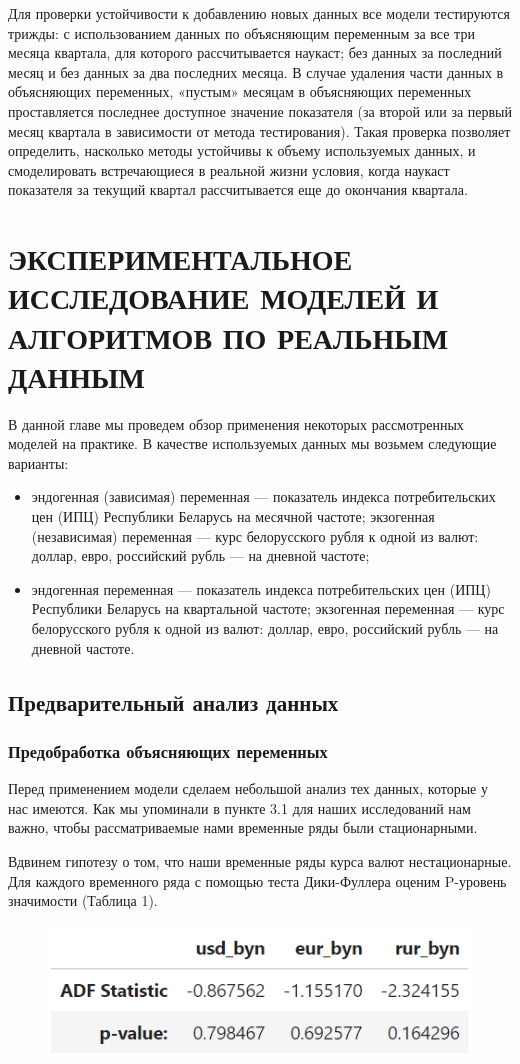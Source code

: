 \documentclass[a4paper, 14pt]{extarticle}
\begin{document}
	Для проверки устойчивости к добавлению новых данных все модели тестируются трижды: с использованием данных по объясняющим переменным за все три месяца квартала, для которого рассчитывается наукаст; без данных за последний месяц и без данных за два последних месяца. В случае удаления части данных в объясняющих переменных, «пустым» месяцам в объясняющих переменных проставляется последнее доступное значение показателя (за второй или за первый месяц квартала в зависимости от метода тестирования). Такая проверка позволяет определить, насколько методы устойчивы к объему используемых данных, и смоделировать встречающиеся в реальной жизни условия, когда наукаст показателя за текущий квартал рассчитывается еще до окончания квартала. 
	\newpage
	\section{ЭКСПЕРИМЕНТАЛЬНОЕ ИССЛЕДОВАНИЕ МОДЕЛЕЙ И АЛГОРИТМОВ ПО РЕАЛЬНЫМ ДАННЫМ}
	В данной главе мы проведем обзор применения некоторых рассмотренных моделей на практике. В качестве используемых данных мы возьмем следующие варианты:
	\begin{itemize}
		\item эндогенная (зависимая) переменная --- показатель индекса потребительских цен (ИПЦ) Республики Беларусь на месячной частоте; экзогенная (независимая) переменная --- курс белорусского рубля к одной из валют: доллар, евро, российский рубль --- на дневной частоте;
		\item эндогенная переменная --- показатель индекса потребительских цен (ИПЦ) Республики Беларусь на квартальной частоте; экзогенная переменная --- курс белорусского рубля к одной из валют: доллар, евро, российский рубль --- на дневной частоте.
	\end{itemize}
	\subsection{Предварительный анализ данных}
	\subsubsection{Предобработка объясняющих переменных}
	Перед применением модели сделаем небольшой анализ тех данных, которые у нас имеются. Как мы упоминали в пункте 3.1 для наших исследований нам важно, чтобы рассматриваемые нами временные ряды были стационарными.
	
	Вдвинем гипотезу о том, что наши временные ряды курса валют нестационарные. Для каждого временного ряда с помощью теста Дики-Фуллера оценим P-уровень значимости (Таблица 1).
	\begin{figure}[h!]
		\centering
		\includegraphics[scale=1.3]{images/tab_1}
		\label{fig:tab1}
	\end{figure}
	
\end{document}
